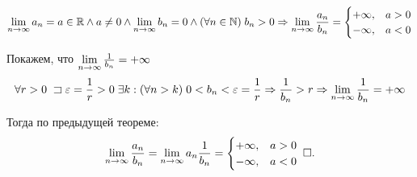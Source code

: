 \documentclass{article}
\begin{document}
\pagebreak

\theorem
\begin{align*}
	\lim\limits_{n\to\infty} a_{n}=a\in\mathbb{R}\land a\neq 0\land\lim\limits_{n\to\infty} b_{n}=0\land (\forall n\in\mathbb{N})\;b_{n}>0\Rightarrow \lim\limits_{n\to\infty} \frac{a_{n}}{b_{n}}=
	\begin{cases}
		+\infty, & a>0 \\
		-\infty, & a<0
	\end{cases}
\end{align*}

\proof

Покажем, что $\lim\limits_{n\to\infty}\frac{1}{b_{n}}=+\infty$
\begin{align*}
	\forall r>0\;\sqsupset\varepsilon=\frac{1}{r}>0\;\exists k:(\forall n>k)\;0<b_{n}<\varepsilon=\frac{1}{r}\Rightarrow \frac{1}{b_{n}}>r\Rightarrow\lim\limits_{n\to\infty}\frac{1}{b_{n}}=+\infty
\end{align*}

Тогда по предыдущей теореме:
\begin{align*}
	\lim\limits_{n\to\infty} \frac{a_{n}}{b_{n}}=\lim\limits_{n\to\infty} a_{n}\frac{1}{b_{n}}=
	\begin{cases}
		+\infty, & a>0 \\
		-\infty, & a<0
	\end{cases}\;\square.
\end{align*}
\end{document}
